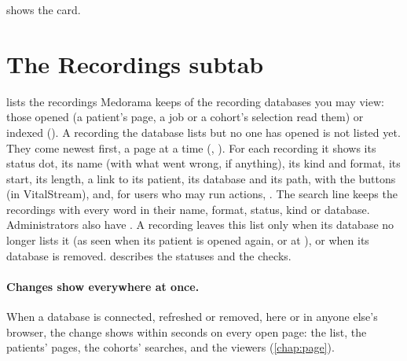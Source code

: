  shows the card.

\section{The Recordings subtab}
\label{sec:databases-tab-recordings}

 lists the recordings Medorama keeps of the recording databases you may view:
those opened (a patient's page, a job or a cohort's selection read them) or indexed (). A recording the database lists but no one has opened is not listed yet. They
come newest first, a
page at a time (\ui{$\langle$}, \ui{$\rangle$}). For each recording it shows its status dot,
its name (with what went wrong, if anything), its kind and format, its start, its length, a link
to its patient, its database and its path, with the buttons  (in VitalStream),
 and, for users who may run actions, . The search line keeps the
recordings with every word in their name, format, status, kind or database. Administrators also
have . A recording leaves this list only when its database no longer lists
it (as seen when its patient is opened again, or at ), or when its
database is removed.  describes the statuses and the
checks.

\paragraph{Changes show everywhere at once.} When a database is connected, refreshed or removed,
here or in anyone else's browser, the change shows within seconds on every open page: the list,
the patients' pages, the cohorts' searches, and the viewers (\cref{chap:page}).
